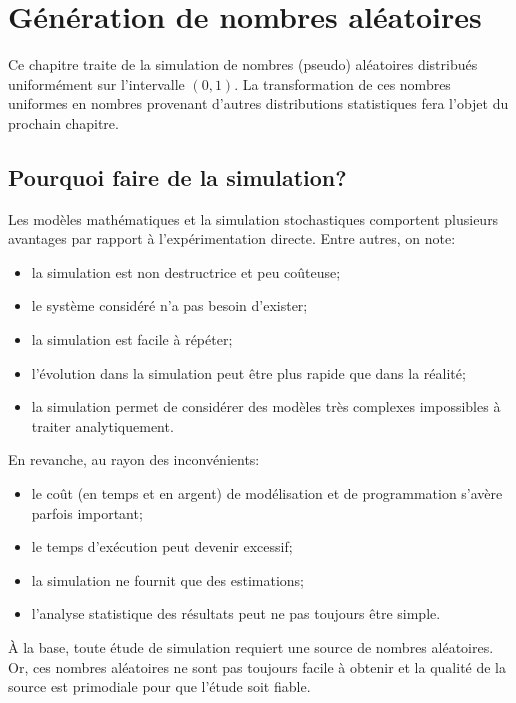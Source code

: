 \chapter{Génération de nombres aléatoires}
\label{chap:generation}

\begin{objectifs}
\item
\end{objectifs}

Ce chapitre traite de la simulation de nombres (pseudo) aléatoires
distribués uniformément sur l'intervalle $(0, 1)$. La transformation
de ces nombres uniformes en nombres provenant d'autres distributions
statistiques fera l'objet du prochain chapitre.


\section{Pourquoi faire de la simulation?}
\label{sec:generation:pourquoi}

Les modèles mathématiques et la simulation stochastiques comportent
plusieurs avantages par rapport à l'expérimentation directe. Entre
autres, on note:
\begin{itemize}
\item la simulation est non destructrice et peu coûteuse;
\item le système considéré n'a pas besoin d'exister;
\item la simulation est facile à répéter;
\item l'évolution dans la simulation peut être plus rapide que dans la
  réalité;
\item la simulation permet de considérer des modèles très complexes
  impossibles à traiter analytiquement.
\end{itemize}
En revanche, au rayon des inconvénients:
\begin{itemize}
\item le coût (en temps et en argent) de modélisation et de
  programmation s'avère parfois important;
\item le temps d'exécution peut devenir excessif;
\item la simulation ne fournit que des estimations;
\item l'analyse statistique des résultats peut ne pas toujours être
  simple.
\end{itemize}

À la base, toute étude de simulation requiert une source de nombres
aléatoires. Or, ces nombres aléatoires ne sont pas toujours facile à
obtenir et la qualité de la source est primodiale pour que l'étude
soit fiable.



